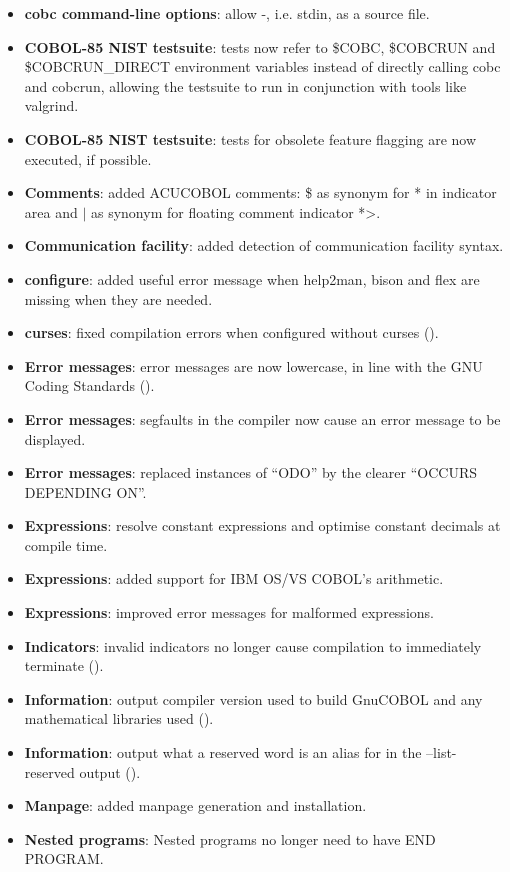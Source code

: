 \begin{itemize}
\item \textbf{cobc command-line options}: allow -, i.e. stdin, as a source file.
\item \textbf{COBOL-85 NIST testsuite}: tests now refer to \$COBC, \$COBCRUN and \$COBCRUN\_DIRECT environment variables instead of directly calling cobc and cobcrun, allowing the testsuite to run in conjunction with tools like valgrind.
\item \textbf{COBOL-85 NIST testsuite}: tests for obsolete feature flagging are now executed, if possible.
\item \textbf{Comments}: added ACUCOBOL comments: \$ as synonym for * in indicator area and $\vert$ as synonym for floating comment indicator *>.
\item \textbf{Communication facility}: added detection of communication facility syntax.
\item \textbf{configure}: added useful error message when help2man, bison and flex are missing when they are needed.
\item \textbf{curses}: fixed compilation errors when configured without curses ().
\item \textbf{Error messages}: error messages are now lowercase, in line with the GNU Coding Standards ().
\item \textbf{Error messages}: segfaults in the compiler now cause an error message to be displayed.
\item \textbf{Error messages}: replaced instances of ``ODO'' by the clearer ``OCCURS DEPENDING ON''.
\item \textbf{Expressions}: resolve constant expressions and optimise constant decimals at compile time.
\item \textbf{Expressions}: added support for IBM OS/VS COBOL's arithmetic.
\item \textbf{Expressions}: improved error messages for malformed expressions.
\item \textbf{Indicators}: invalid indicators no longer cause compilation to immediately terminate ().
\item \textbf{Information}: output compiler version used to build GnuCOBOL and any mathematical libraries used ().
\item \textbf{Information}: output what a reserved word is an alias for in the --list-reserved output ().
\item \textbf{Manpage}: added manpage generation and installation.
\item \textbf{Nested programs}: Nested programs no longer need to have END PROGRAM.

\end{itemize}
